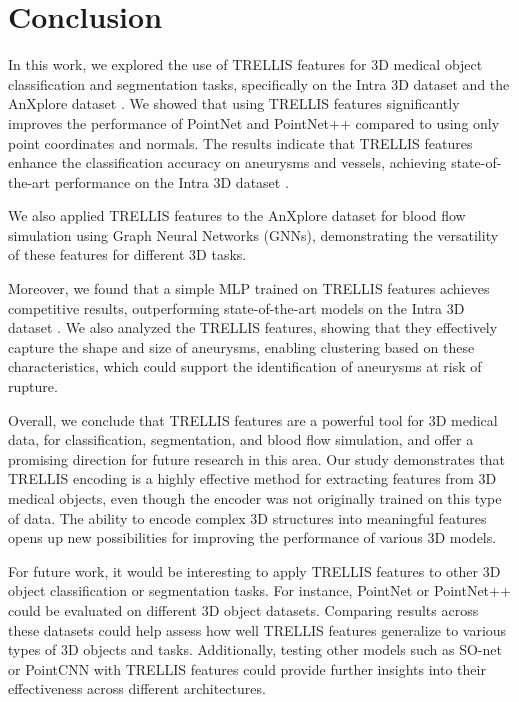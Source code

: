 \documentclass[%
 reprint,
 amsmath,amssymb,
 aps,
 floatfix,
 nofootinbib,
]{revtex4-2}
\begin{document}
\section{Conclusion} \label{CONCLUSION}

In this work, we explored the use of TRELLIS \citep{xiang2024structured} features for 3D medical object classification and segmentation tasks, specifically on the Intra 3D dataset \citep{yang2020intra} and the AnXplore dataset \citep{anxplore}. We showed that using TRELLIS features significantly improves the performance of PointNet \citep{pointnet} and PointNet++ \citep{pointnetpp} compared to using only point coordinates and normals. The results indicate that TRELLIS features enhance the classification accuracy on aneurysms and vessels, achieving state-of-the-art performance on the Intra 3D dataset \citep{yang2020intra}.

We also applied TRELLIS features to the AnXplore dataset \citep{anxplore} for blood flow simulation using Graph Neural Networks (GNNs), demonstrating the versatility of these features for different 3D tasks.

Moreover, we found that a simple MLP trained on TRELLIS features achieves competitive results, outperforming state-of-the-art models on the Intra 3D dataset \citep{yang2020intra}. We also analyzed the TRELLIS features, showing that they effectively capture the shape and size of aneurysms, enabling clustering based on these characteristics, which could support the identification of aneurysms at risk of rupture.

Overall, we conclude that TRELLIS features are a powerful tool for 3D medical data, for classification, segmentation, and blood flow simulation, and offer a promising direction for future research in this area. Our study demonstrates that TRELLIS encoding is a highly effective method for extracting features from 3D medical objects, even though the encoder was not originally trained on this type of data. The ability to encode complex 3D structures into meaningful features opens up new possibilities for improving the performance of various 3D models.

For future work, it would be interesting to apply TRELLIS features to other 3D object classification or segmentation tasks. For instance, PointNet or PointNet++ could be evaluated on different 3D object datasets. Comparing results across these datasets could help assess how well TRELLIS features generalize to various types of 3D objects and tasks. Additionally, testing other models such as SO-net \citep{sonet} or PointCNN \citep{pointcnn} with TRELLIS features could provide further insights into their effectiveness across different architectures.
\end{document}
